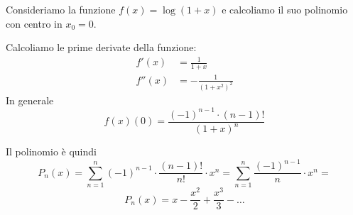 \begin{example}
Consideriamo la funzione $f(x) = \log (1+x)$ e calcoliamo il suo polinomio con centro in $x_0 = 0$.

Calcoliamo le prime derivate della funzione:
\begin{align*}
f'(x) &= \frac{1}{1+x} \\
f''(x) &= - \frac{1}{(1+x^2)^2}
\end{align*}
In generale
\begin{equation*}
f(x) (0) = \frac{(-1)^{n-1} \cdot (n-1)!}{(1+x)^n}
\end{equation*}

Il polinomio è quindi
\begin{equation*}
P_n(x) = \sum_{n=1}^n (-1)^{n-1} \cdot \frac{(n-1)!}{n!} \cdot x^n = \sum_{n=1}^n \frac{(-1)^{n-1}}{n} \cdot x^n = 
\end{equation*}
\begin{equation*}
P_n(x) = x - \frac{x^2}{2} + \frac{x^3}{3} - \ldots
\end{equation*}
\end{example}